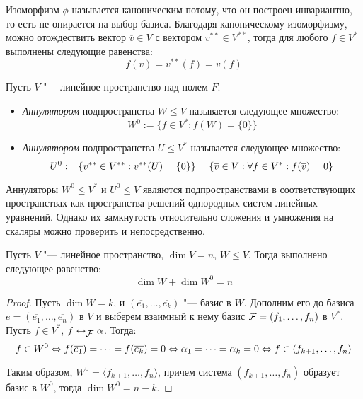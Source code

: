     \begin{note}
    	Изоморфизм $\phi$ называется каноническим потому, что он построен инвариантно, то есть не опирается на выбор базиса. Благодаря каноническому изоморфизму, можно отождествить вектор $\overline{v} \in V$ с вектором $v^{**} \in V^{**}$, тогда для любого $f \in V^*$ выполнены следующие равенства:
    	\[f(\overline{v}) = v^{**}(f) = \overline{v}(f)\]
    \end{note}
    
    \begin{definition}
    	Пусть $V$ "--- линейное пространство над полем $F$.
    	\begin{itemize}
    		\item \textit{Аннулятором} подпространства $W \le V$ называется следующее множество:
    		\[W^0 := \{f \in V^*: f(W) = \{0\}\}\]
    		\item \textit{Аннулятором} подпространства $U \le V^*$ называется следующее множество:
    		\[
    		U^0 := \{v^{**} \in V^{**}: v^{**}(U) = \{0\}\}
    		\hm{=}
    		\{\overline{v} \in V: \forall f \in V^*: f(\overline{v}) = 0\}
    		\]
    	\end{itemize}
    \end{definition}
    
    \begin{note}
    	Аннуляторы $W^0 \le V^*$ и $U^0 \le V$ являются подпространствами в соответствующих пространствах как пространства решений однородных систем линейных уравнений. Однако их замкнутость относительно сложения и умножения на скаляры можно проверить и непосредственно.
    \end{note}
    
    \begin{theorem}
    	Пусть $V$ "--- линейное пространство, $\dim{V} = n$, $W \le V$. Тогда выполнено следующее равенство:
    	\[\dim{W} + \dim{W^0} = n\]
    \end{theorem}
    
    \begin{proof}
    	Пусть $\dim{W} = k$, и $(\overline{e_1}, \dots, \overline{e_k})$ "--- базис в $W$. Дополним его до базиса $e = (\overline{e_1}, \dots, \overline{e_n})$ в $V$ и выберем взаимный к нему базис $\FF  = (f_1, \dots, f_n)$ в $V^*$. Пусть $f \in V^*$, $f \leftrightarrow_{\FF } \alpha$. Тогда:
    	\[f \in W^0 \lra f(\overline{e_1}) = \dots = f(\overline{e_k}) = 0 \lra \alpha_1 \hm{=} \dots = \alpha_k = 0 \Leftrightarrow f \in \langle f_{k+1}, \dots, f_n\rangle\]
    	
    	Таким образом, $W^0 = \langle f_{k+1}, \dots, f_n \rangle$, причем система $(f_{k+1}, \dots, f_n)$ образует базис в $W^0$, тогда $\dim{W^0} = n - k$.
    \end{proof}
    
